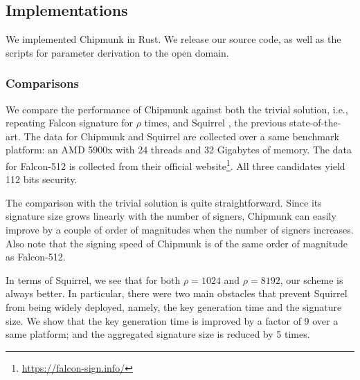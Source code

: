 \subsection{Implementations}
We implemented Chipmunk in Rust. We release our source code, as well as the scripts for parameter derivation to the open domain.

\subsubsection{Comparisons}\label{ss:comparison}

We compare the performance of Chipmunk against both the trivial solution, i.e., repeating Falcon signature for $\rho$ times, and
Squirrel \cite{CCS:FleSimZha22}, the previous state-of-the-art. The data for Chipmunk and Squirrel are collected over a same benchmark platform: an AMD 5900x with 24 threads
and 32 Gigabytes of memory. The data for Falcon-512 is collected from their official website\footnote{\url{https://falcon-sign.info/}}.
All three candidates yield 112 bits security.

The comparison with the trivial solution is quite straightforward. Since its signature size grows linearly with the number of signers,
Chipmunk can easily improve by a couple of order of magnitudes when the number of signers increases.
Also note that the signing speed of Chipmunk is of the same order of magnitude as Falcon-512.

In terms of Squirrel, we see that for both $\rho = 1024$ and $\rho = 8192$, our scheme is always better. 
In particular, there were two main obstacles that prevent Squirrel from being widely deployed, namely, the key generation time
and the signature size. We show that the key generation time is improved by a factor of 9 over a same platform; and the 
aggregated signature size is reduced by 5 times. 


